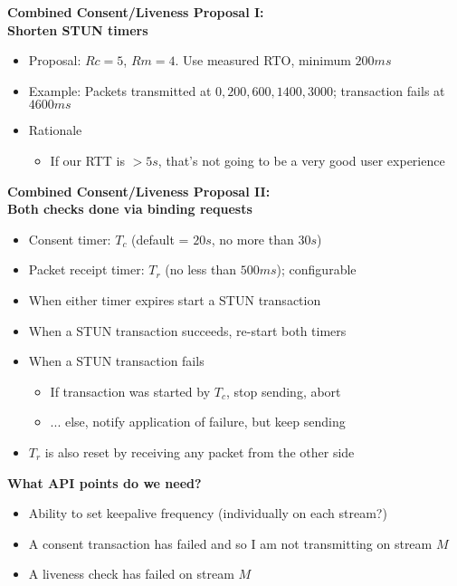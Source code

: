 \documentclass[helvetica]{seminar}
\newcommand{\heading}[1]{%
  \begin{center} 
    \large\bf 
    #1 
  \end{center} 
  \vspace{.4 in}}
\begin{document}
\begin{slide}
\heading{Combined Consent/Liveness Proposal I:\\Shorten STUN timers}

  \begin{itemize}
  \item Proposal: $Rc = 5$, $Rm = 4$. Use measured RTO, minimum $200 ms$
  \item Example: Packets transmitted at $0, 200, 600, 1400, 3000$; transaction fails at $4600ms$
  \item Rationale
    \begin{itemize}
    \item If our RTT is $> 5s$, that's not going to be a very good user experience
    \end{itemize}
  \end{itemize}

\end{slide}


\begin{slide}
\heading{Combined Consent/Liveness Proposal II:\\Both checks done via binding requests}

  \begin{itemize}
  \item Consent timer: $T_{c}$ (default = $20s$, no more than $30s$)
  \item Packet receipt timer: $T_{r}$ (no less than $500 ms$); configurable
  \item When either timer expires start a STUN transaction
  \item When a STUN transaction succeeds, re-start both timers
  \item When a STUN transaction fails
    \begin{itemize}
    \item If transaction was started by $T_c$, stop sending, abort
    \item ... else, notify application of failure, but keep sending
    \end{itemize}

  \item $T_r$ is also reset by receiving any packet from the other side
  \end{itemize}
\end{slide}


\begin{slide}
\heading{What API points do we need?}

\begin{itemize}
\item Ability to set keepalive frequency (individually on each stream?)
\item A consent transaction has failed and so I am not transmitting on stream $M$
\item A liveness check has failed on stream $M$
\end{itemize}
\end{slide}
\end{document}
